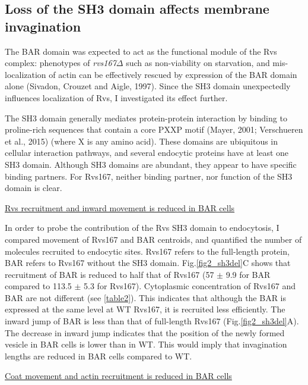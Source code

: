 	\subsection{Loss of the SH3 domain affects membrane invagination}
	\label{delsh3_movement}
The BAR domain was expected to act as the functional module of the Rvs complex: phenotypes of \textit{rvs167$\Delta$}  such as non-viability on starvation, and mis-localization of actin can be effectively rescued by expression of the BAR domain alone (Sivadon, Crouzet and Aigle, 1997). Since the SH3 domain unexpectedly influences localization of Rvs, I investigated its effect further.

	\vspace{5mm}
The SH3 domain generally mediates protein-protein interaction by binding to proline-rich sequences that contain a core PXXP motif (Mayer, 2001; Verschueren et al., 2015) (where X is any amino acid). These domains are ubiquitous in cellular interaction pathways, and several endocytic proteins have at least one SH3 domain. Although SH3 domains are abundant, they appear to have specific binding partners. For Rvs167, neither binding partner, nor function of the SH3 domain is clear. 


	\vspace{5mm}
\underline{Rvs recruitment and inward movement is reduced in BAR cells}

In order to probe the contribution of the Rvs SH3 domain to endocytosis, I compared movement of Rvs167 and BAR centroids, and quantified the number of molecules recruited to endocytic sites. Rvs167 refers to the full-length protein, BAR refers to Rvs167 without the SH3 domain. Fig.\ref{fig2_sh3del}C shows that recruitment of BAR is reduced to half that of Rvs167 (57 $\pm$ 9.9 for BAR compared to 113.5 $\pm$ 5.3 for Rvs167). Cytoplasmic concentration of Rvs167 and BAR are not different (see \ref{table2}). This indicates that although the BAR is expressed at the same level at WT Rvs167, it is recruited less efficiently. 
The inward jump of BAR is less than that of full-length Rvs167 (Fig.\ref{fig2_sh3del}A). The decrease in inward jump indicates that the position of the newly formed vesicle in BAR cells is lower than in WT. This would imply that invagination lengths are reduced in BAR cells compared to WT.

	\vspace{5mm}
	\newpage
	\underline{Coat movement and actin recruitment is reduced in BAR cells}
	
